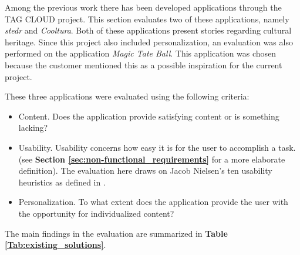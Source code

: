Among the previous work there has been developed applications through the TAG CLOUD project. This section evaluates two of these applications, namely \textit{stedr} and \textit{Cooltura}. Both of these applications present stories regarding cultural heritage. Since this project also included personalization, an evaluation was also performed on the application \textit{Magic Tate Ball}. This application was chosen because the customer mentioned this as a possible inspiration for the current project. \newline

These three applications were evaluated using the following criteria:
\begin{itemize}
\item Content. Does the application provide satisfying content or is something lacking?
\item Usability. Usability concerns how easy it is for the user to accomplish a task. (see \textbf{Section \ref{sec:non-functional_requirements}} for a more elaborate definition). The evaluation here draws on Jacob Nielsen’s ten usability heuristics as defined in \cite{AS3}.  
\item Personalization. To what extent does the application provide the user with the opportunity for individualized content?
\end{itemize}

The main findings in the evaluation are summarized in \textbf{Table \ref{Tab:existing_solutions}}.

